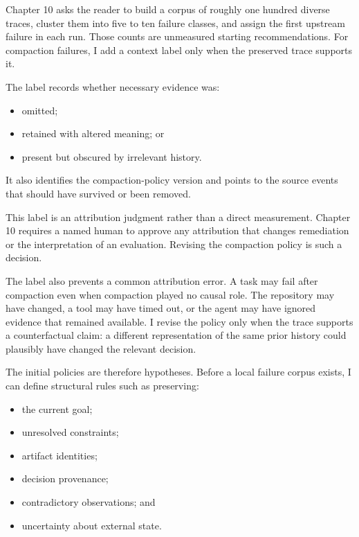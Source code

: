 Chapter 10 asks the reader to build a corpus of roughly one hundred diverse traces, cluster them into five to ten failure classes, and assign the first upstream failure in each run. Those counts are unmeasured starting recommendations. For compaction failures, I add a context label only when the preserved trace supports it.


The label records whether necessary evidence was:

\begin{itemize}
\tightlist
\item
  omitted;
\item
  retained with altered meaning; or
\item
  present but obscured by irrelevant history.
\end{itemize}

It also identifies the compaction-policy version and points to the source events that should have survived or been removed.

This label is an attribution judgment rather than a direct measurement. Chapter 10 requires a named human to approve any attribution that changes remediation or the interpretation of an evaluation. Revising the compaction policy is such a decision.

The label also prevents a common attribution error. A task may fail after compaction even when compaction played no causal role. The repository may have changed, a tool may have timed out, or the agent may have ignored evidence that remained available. I revise the policy only when the trace supports a counterfactual claim: a different representation of the same prior history could plausibly have changed the relevant decision.


The initial policies are therefore hypotheses. Before a local failure corpus exists, I can define structural rules such as preserving:

\begin{itemize}
\tightlist
\item
  the current goal;
\item
  unresolved constraints;
\item
  artifact identities;
\item
  decision provenance;
\item
  contradictory observations; and
\item
  uncertainty about external state.
\end{itemize}

